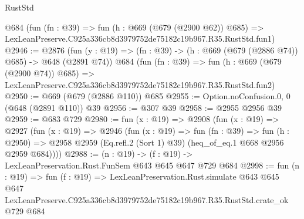 \begin{lexlean}{RustStd}
\begin{coremodule}
    @684
    (fun (fn : @39) =>
    fun (h : @669 (@679 (@2900 @62)) @685) =>
    LexLeanPreserve.C925a336cb8d3979752de75182c19b967.R35.RustStd.fun1)
@2946 := @2876
    (fun (y : @19) => (fn : @39) -> (h : @669 (@679 (@2886 @74)) @685) -> @648 (@2891 @74))
    @684
    (fun (fn : @39) =>
    fun (h : @669 (@679 (@2900 @74)) @685) =>
    LexLeanPreserve.C925a336cb8d3979752de75182c19b967.R35.RustStd.fun2)
@2950 := @669 (@679 (@2886 @110)) @685
@2955 := Option.noConfusion.{0, 0} (@648 (@2891 @110)) @39
@2956 := @307 @39
@2958 := @2955 @2956 @39
@2959 := @683 @729
@2980 := fun (x : @19) =>
  @2908
    (fun (x : @19) =>
    @2927
      (fun (x : @19) =>
      @2946
        (fun (x : @19) =>
        fun (fn : @39) =>
        fun (h : @2950) =>
        @2958 @2959 (Eq.refl.{2} (Sort 1) @39) (heq_of_eq.{1} @668 @2956 @2959 @684))))
@2988 := (n : @19) -> (f : @19) -> LexLeanPreservation.Rust.FunSem @643 @645 @647 @729 @684
@2998 := fun (n : @19) =>
  fun (f : @19) =>
  LexLeanPreservation.Rust.simulate
    @643
    @645
    @647
    LexLeanPreserve.C925a336cb8d3979752de75182c19b967.R35.RustStd.crate_ok
    @729
    @684
\end{coremodule}
\end{lexlean}

